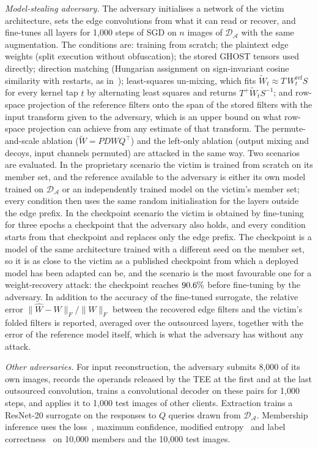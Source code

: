 \documentclass[lettersize,journal]{IEEEtran}
\begin{document}
\emph{Model-stealing adversary.} The adversary initialises a network of the victim architecture, sets the edge convolutions from what it can read or recover, and fine-tunes all layers for 1{,}000 steps of SGD on $n$ images of $\mathcal{D}_{\mathcal{A}}$ with the same augmentation. The conditions are: training from scratch; the plaintext edge weights (split execution without obfuscation); the stored GHOST tensors used directly; direction matching (Hungarian assignment on sign-invariant cosine similarity with restarts, as in~\cite{wang2025arrows}); least-squares un-mixing, which fits $\tilde W_t\approx T\,W^{\mathrm{ref}}_t S$ for every kernel tap $t$ by alternating least squares and returns $T^{+}\tilde W_t S^{-1}$; and row-space projection of the reference filters onto the span of the stored filters with the input transform given to the adversary, which is an upper bound on what row-space projection can achieve from any estimate of that transform. The permute-and-scale ablation ($\tilde W=PDWQ^{\top}$) and the left-only ablation (output mixing and decoys, input channels permuted) are attacked in the same way. Two scenarios are evaluated. In the proprietary scenario the victim is trained from scratch on its member set, and the reference available to the adversary is either its own model trained on $\mathcal{D}_{\mathcal{A}}$ or an independently trained model on the victim's member set; every condition then uses the same random initialisation for the layers outside the edge prefix. In the checkpoint scenario the victim is obtained by fine-tuning for three epochs a checkpoint that the adversary also holds, and every condition starts from that checkpoint and replaces only the edge prefix. The checkpoint is a model of the same architecture trained with a different seed on the member set, so it is as close to the victim as a published checkpoint from which a deployed model has been adapted can be, and the scenario is the most favourable one for a weight-recovery attack: the checkpoint reaches $90.6\%$ before fine-tuning by the adversary. In addition to the accuracy of the fine-tuned surrogate, the relative error $\|\hat W-W\|_F/\|W\|_F$ between the recovered edge filters and the victim's folded filters is reported, averaged over the outsourced layers, together with the error of the reference model itself, which is what the adversary has without any attack.

\emph{Other adversaries.} For input reconstruction, the adversary submits 8{,}000 of its own images, records the operands released by the TEE at the first and at the last outsourced convolution, trains a convolutional decoder on these pairs for 1{,}000 steps, and applies it to 1{,}000 test images of other clients. Extraction trains a ResNet-20 surrogate on the responses to $Q$ queries drawn from $\mathcal{D}_{\mathcal{A}}$. Membership inference uses the loss~\cite{yeom2018privacy}, maximum confidence, modified entropy~\cite{song2021systematic} and label correctness~\cite{choquettechoo2021label} on 10{,}000 members and the 10{,}000 test images.
\end{document}
